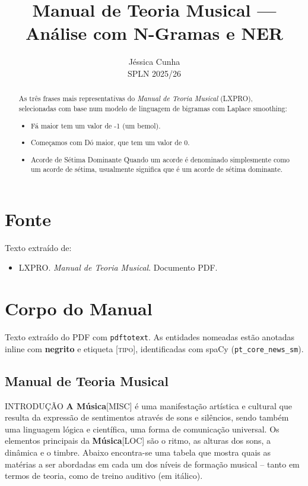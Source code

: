\documentclass[a4paper,12pt]{article}
\title{Manual de Teoria Musical --- Análise com N-Gramas e NER}
\author{Jéssica Cunha \\ SPLN 2025/26}
\date{}
\begin{document}
\maketitle

\begin{abstract}
As três frases mais representativas do \textit{Manual de Teoria Musical} (LXPRO),
selecionadas com base num modelo de linguagem de bigramas com Laplace smoothing:

\begin{itemize}
  \item Fá maior tem um valor de -1 (um bemol).
  \item Começamos com Dó maior, que tem um valor de 0.
  \item Acorde de Sétima Dominante Quando um acorde é denominado simplesmente como um acorde de sétima, usualmente significa que é um acorde de sétima dominante.
\end{itemize}
\end{abstract}

\section{Fonte}
Texto extraído de:
\begin{itemize}
  \item LXPRO. \textit{Manual de Teoria Musical}. Documento PDF.
\end{itemize}

\section{Corpo do Manual}
Texto extraído do PDF com \texttt{pdftotext}. As entidades nomeadas estão anotadas
inline com \textbf{negrito} e etiqueta \textsc{[tipo]}, identificadas com spaCy
(\texttt{pt\_core\_news\_sm}).

\subsection*{Manual de Teoria Musical}
INTRODUÇÃO \textbf{A Música}\textsc{[MISC]} é uma manifestação artística e cultural que resulta da expressão de sentimentos através de sons e silêncios, sendo também uma linguagem lógica e científica, uma forma de comunicação universal. Os elementos principais da \textbf{Música}\textsc{[LOC]} são o ritmo, as alturas dos sons, a dinâmica e o timbre. Abaixo encontra-se uma tabela que mostra quais as matérias a ser abordadas em cada um dos níveis de formação musical -- tanto em termos de teoria, como de treino auditivo (em itálico).
\end{document}
